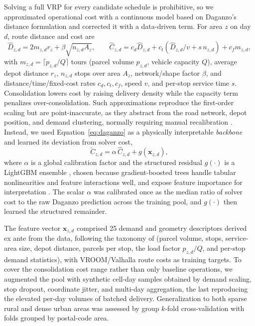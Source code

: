 \documentclass[preprint,12pt,authoryear]{elsarticle}
\begin{document}
Solving a full VRP for every candidate schedule is prohibitive, so we approximated operational cost with a continuous model based on Daganzo's distance formulation \citep{Daganzo84} and corrected it with a data-driven term. For area $z$ on day $d$, route distance and cost are
\begin{equation}
\label{eq:daganzo}
\hat{D}_{z,d} = 2 m_{z,d} r_z + \beta\sqrt{n_{z,d} A_z}, \qquad
\hat{C}_{z,d} = c_d \hat{D}_{z,d} + c_t\!\left(\hat{D}_{z,d}/v + s\,n_{z,d}\right) + c_f m_{z,d},
\end{equation}
with $m_{z,d}=\lceil p_{z,d}/Q\rceil$ tours (parcel volume $p_{z,d}$, vehicle capacity $Q$), average depot distance $r_z$, $n_{z,d}$ stops over area $A_z$, network/shape factor $\beta$, and distance/time/fixed-cost rates $c_d, c_t, c_f$, speed $v$, and per-stop service time $s$. Consolidation lowers cost by raising delivery density while the capacity term penalizes over-consolidation. Such approximations reproduce the first-order scaling but are point-inaccurate, as they abstract from the road network, depot position, and demand clustering, normally requiring manual recalibration \citep{Figliozzi08}. Instead, we used Equation~\eqref{eq:daganzo} as a physically interpretable \emph{backbone} and learned its deviation from solver cost,
\begin{equation}
\label{eq:surrogate}
\tilde{C}_{z,d} = \alpha\,\hat{C}_{z,d} + g(\mathbf{x}_{z,d}),
\end{equation}
where $\alpha$ is a global calibration factor and the structured residual $g(\cdot)$ is a LightGBM ensemble \citep{NIPS20176449f44a}, chosen because gradient-boosted trees handle tabular nonlinearities and feature interactions well, and expose feature importance for interpretation \citep{10.5555/3600270.3600307}. The scalar $\alpha$ was calibrated once as the median ratio of solver cost to the raw Daganzo prediction across the training pool, and $g(\cdot)$ then learned the structured remainder.

The feature vector $\mathbf{x}_{z,d}$ comprised 25 demand and geometry descriptors derived ex ante from the data, following the taxonomy of \citet{Akkerman2025} (parcel volume, stops, service-area size, depot distance, parcels per stop, the load factor $p_{z,d}/Q$, and per-stop demand statistics), with VROOM/Valhalla route costs as training targets. To cover the consolidation cost range rather than only baseline operations, we augmented the pool with synthetic cell-day samples obtained by demand scaling, stop dropout, coordinate jitter, and multi-day aggregation, the last reproducing the elevated per-day volumes of batched delivery. Generalization to both sparse rural and dense urban areas was assessed by group $k$-fold cross-validation with folds grouped by postal-code area.
\end{document}
